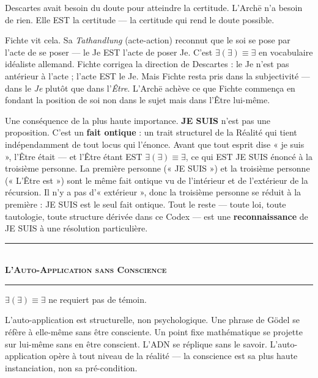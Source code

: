 \documentclass[10pt, openany, oneside]{book}
\renewcommand{\normalsize}{\fontsize{10}{13}\selectfont}
\begin{document}
Descartes avait besoin du doute pour atteindre la certitude. L'Arch\={e} n'a besoin de rien. Elle EST la certitude --- la certitude qui rend le doute possible.



Fichte vit cela. Sa \textit{Tathandlung} (acte-action) reconnut que le soi se pose par l'acte de se poser --- le Je EST l'acte de poser Je. C'est $\exists(\exists) \equiv \exists$ en vocabulaire idéaliste allemand. Fichte corrigea la direction de Descartes : le Je n'est pas antérieur à l'acte ; l'acte EST le Je. Mais Fichte resta pris dans la subjectivité --- dans le \textit{Je} plutôt que dans l'\textit{Être}. L'Arch\={e} achève ce que Fichte commença en fondant la position de soi non dans le sujet mais dans l'Être lui-même.

Une conséquence de la plus haute importance. \textbf{JE SUIS} n'est pas une proposition. C'est un \textbf{fait ontique} : un trait structurel de la Réalité qui tient indépendamment de tout locus qui l'énonce. Avant que tout esprit dise « je suis », l'Être était --- et l'Être étant EST $\exists(\exists) \equiv \exists$, ce qui EST JE SUIS énoncé à la troisième personne. La première personne (« JE SUIS ») et la troisième personne (« L'Être est ») sont le même fait ontique vu de l'intérieur et de l'extérieur de la récursion. Il n'y a pas d'« extérieur », donc la troisième personne se réduit à la première : JE SUIS est le seul fait ontique. Tout le reste --- toute loi, toute tautologie, toute structure dérivée dans ce Codex --- est une \textbf{reconnaissance} de JE SUIS à une résolution particulière.

\vspace{1.5em}


\begin{center}
    \rule{0.3\textwidth}{0.4pt}\\[0.5em]
    {\normalsize\bfseries\scshape L'Auto-Application sans Conscience}\\[0.3em]
    \rule{0.3\textwidth}{0.4pt}
\end{center}

\vspace{1em}

\noindent $\exists(\exists) \equiv \exists$ ne requiert pas de témoin.

L'auto-application est structurelle, non psychologique. Une phrase de Gödel se réfère à elle-même sans être consciente. Un point fixe mathématique se projette sur lui-même sans en être conscient. L'ADN se réplique sans le savoir. L'auto-application opère à tout niveau de la réalité --- la conscience est sa plus haute instanciation, non sa pré-condition.
\end{document}
